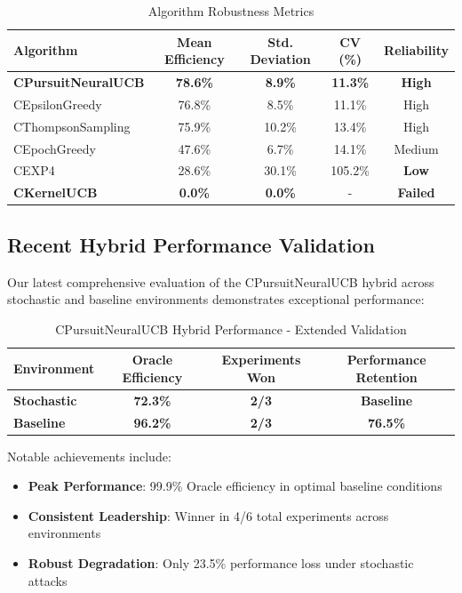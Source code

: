 \documentclass[12pt,a4paper]{article}
\newcommand{\primarytext}[1]{\textcolor{primaryblue}{\textbf{#1}}}
\newcommand{\secondarytext}[1]{\textcolor{secondaryblue}{\textbf{#1}}}
\newcommand{\success}[1]{\textcolor{accentgreen}{\textbf{#1}}}
\newcommand{\warning}[1]{\textcolor{warningred}{\textbf{#1}}}
\begin{document}
\begin{table}[H]
\centering
\caption{Algorithm Robustness Metrics}
\begin{tabular}{@{}lcccc@{}}
\toprule
\textbf{Algorithm} & \textbf{Mean Efficiency} & \textbf{Std. Deviation} & \textbf{CV (\%)} & \textbf{Reliability} \\
\midrule
\success{CPursuitNeuralUCB} & \success{78.6\%} & \success{8.9\%} & \success{11.3\%} & \success{High} \\
CEpsilonGreedy & 76.8\% & 8.5\% & 11.1\% & High \\
CThompsonSampling & 75.9\% & 10.2\% & 13.4\% & High \\
CEpochGreedy & 47.6\% & 6.7\% & 14.1\% & Medium \\
CEXP4 & 28.6\% & 30.1\% & 105.2\% & \warning{Low} \\
\warning{CKernelUCB} & \warning{0.0\%} & \warning{0.0\%} & - & \warning{Failed} \\
\bottomrule
\end{tabular}
\end{table}

\subsection{Recent Hybrid Performance Validation}

Our latest comprehensive evaluation of the CPursuitNeuralUCB hybrid across stochastic and baseline environments demonstrates exceptional performance:

\begin{table}[H]
\centering
\caption{CPursuitNeuralUCB Hybrid Performance - Extended Validation}
\begin{tabular}{@{}lccc@{}}
\toprule
\textbf{Environment} & \textbf{Oracle Efficiency} & \textbf{Experiments Won} & \textbf{Performance Retention} \\
\midrule
\success{Stochastic} & \success{72.3\%} & \success{2/3} & \success{Baseline} \\
\success{Baseline} & \success{96.2\%} & \success{2/3} & \success{76.5\%} \\
\bottomrule
\end{tabular}
\end{table}

Notable achievements include:
\begin{itemize}
\item \success{Peak Performance}: 99.9\% Oracle efficiency in optimal baseline conditions
\item \primarytext{Consistent Leadership}: Winner in 4/6 total experiments across environments
\item \secondarytext{Robust Degradation}: Only 23.5\% performance loss under stochastic attacks
\end{itemize}
\end{document}
